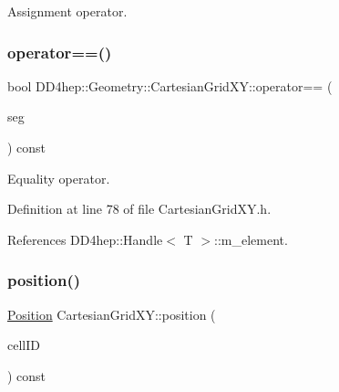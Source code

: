 Assignment operator. 

\hypertarget{class_d_d4hep_1_1_geometry_1_1_cartesian_grid_x_y_abf9c6024e8f908d291374e4d4cd1ed21}{}\label{class_d_d4hep_1_1_geometry_1_1_cartesian_grid_x_y_abf9c6024e8f908d291374e4d4cd1ed21} 
\subsubsection{\texorpdfstring{operator==()}{operator==()}}
{\footnotesize\ttfamily bool D\+D4hep\+::\+Geometry\+::\+Cartesian\+Grid\+X\+Y\+::operator== (\begin{DoxyParamCaption}\item[{const \hyperlink{class_d_d4hep_1_1_geometry_1_1_cartesian_grid_x_y}{Cartesian\+Grid\+XY} \&}]{seg }\end{DoxyParamCaption}) const\hspace{0.3cm}{\ttfamily [inline]}}



Equality operator. 



Definition at line 78 of file Cartesian\+Grid\+X\+Y.\+h.



References D\+D4hep\+::\+Handle$<$ T $>$\+::m\+\_\+element.

\hypertarget{class_d_d4hep_1_1_geometry_1_1_cartesian_grid_x_y_ac835aa93486b46056e0516ce276ffca5}{}\label{class_d_d4hep_1_1_geometry_1_1_cartesian_grid_x_y_ac835aa93486b46056e0516ce276ffca5} 
\subsubsection{\texorpdfstring{position()}{position()}}
{\footnotesize\ttfamily \hyperlink{namespace_d_d4hep_1_1_geometry_a55083902099d03506c6db01b80404900}{Position} Cartesian\+Grid\+X\+Y\+::position (\begin{DoxyParamCaption}\item[{const Cell\+ID \&}]{cell\+ID }\end{DoxyParamCaption}) const}



